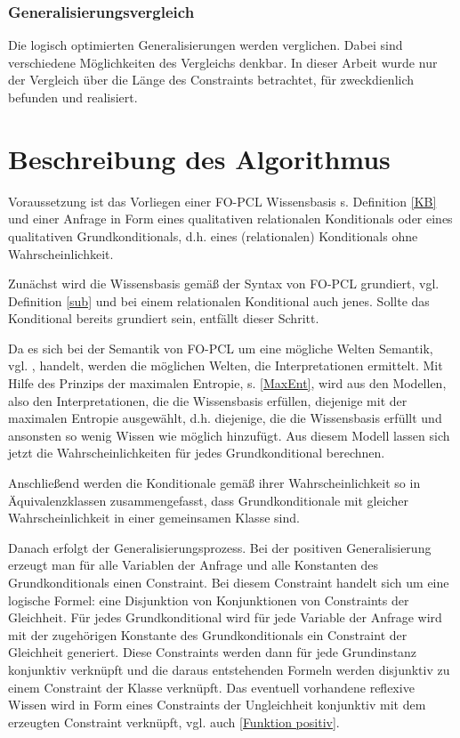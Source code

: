\documentclass[draft]{scrreprt}
\begin{document}
{\subsubsection{Generalisierungsvergleich}
Die logisch optimierten Generalisierungen werden verglichen. Dabei sind verschiedene Möglichkeiten des Vergleichs denkbar. In dieser Arbeit wurde nur der Vergleich über die Länge des Constraints betrachtet, für zweckdienlich befunden und realisiert.

\section{Beschreibung des Algorithmus}
Voraussetzung ist das Vorliegen einer FO-PCL Wissensbasis  s. Definition \ref{KB} und einer Anfrage in Form eines qualitativen relationalen Konditionals oder eines qualitativen Grundkonditionals, d.h. eines (relationalen) Konditionals ohne Wahrscheinlichkeit.

Zunächst wird die Wissensbasis gemäß der Syntax von FO-PCL grundiert, vgl. Definition \ref{sub}  und bei einem relationalen Konditional auch jenes. Sollte das Konditional bereits grundiert sein, entfällt dieser Schritt.

Da es sich bei der Semantik von FO-PCL um eine mögliche Welten Semantik, vgl. \cite{GT07}, handelt, werden die möglichen Welten, die Interpretationen ermittelt. Mit Hilfe des Prinzips der maximalen Entropie, s. \ref{MaxEnt},  wird aus den Modellen, also den Interpretationen, die die Wissensbasis erfüllen, diejenige mit der maximalen Entropie ausgewählt, d.h. diejenige, die die Wissensbasis erfüllt und ansonsten so wenig Wissen wie möglich hinzufügt.
Aus diesem Modell lassen sich jetzt die Wahrscheinlichkeiten für jedes Grundkonditional berechnen.


Anschließend werden die Konditionale gemäß ihrer Wahrscheinlichkeit so in Äquivalenzklassen zusammengefasst, dass Grundkonditionale mit gleicher Wahrscheinlichkeit in einer gemeinsamen Klasse sind. 

Danach erfolgt der Generalisierungsprozess.
Bei der positiven Generalisierung  erzeugt man für alle Variablen der Anfrage und alle Konstanten des Grundkonditionals einen Constraint. Bei diesem Constraint handelt sich um eine logische Formel: eine Disjunktion von Konjunktionen von Constraints der Gleichheit. Für jedes Grundkonditional wird für jede Variable der Anfrage wird mit der zugehörigen Konstante des Grundkonditionals ein Constraint der Gleichheit generiert. Diese Constraints werden dann für jede Grundinstanz konjunktiv verknüpft und die daraus entstehenden Formeln werden disjunktiv zu einem Constraint der Klasse verknüpft. Das eventuell vorhandene reflexive Wissen wird in Form eines Constraints der Ungleichheit konjunktiv mit dem erzeugten Constraint verknüpft, vgl. auch \ref{Funktion positiv}.

}
\end{document}
